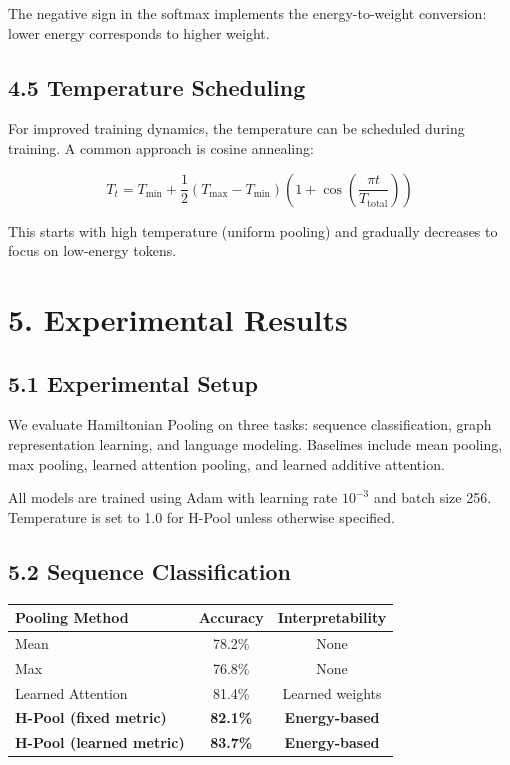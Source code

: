 \documentclass[12pt]{article}
\begin{document}
The negative sign in the softmax implements the energy-to-weight conversion: lower energy corresponds to higher weight.

\subsection{4.5 Temperature Scheduling}

For improved training dynamics, the temperature can be scheduled during training. A common approach is cosine annealing:

\begin{equation}
T_t = T_{\min} + \frac{1}{2}(T_{\max} - T_{\min}) \left(1 + \cos\left(\frac{\pi t}{T_{\text{total}}}\right)\right)
\end{equation}

This starts with high temperature (uniform pooling) and gradually decreases to focus on low-energy tokens.

\section{5. Experimental Results}

\subsection{5.1 Experimental Setup}

We evaluate Hamiltonian Pooling on three tasks: sequence classification, graph representation learning, and language modeling. Baselines include mean pooling, max pooling, learned attention pooling, and learned additive attention.

All models are trained using Adam with learning rate $10^{-3}$ and batch size 256. Temperature is set to 1.0 for H-Pool unless otherwise specified.

\subsection{5.2 Sequence Classification}

\begin{center}
\begin{tabular}{|l|c|c|}
\hline
\textbf{Pooling Method} & \textbf{Accuracy} & \textbf{Interpretability} \\
\hline
Mean & 78.2\% & None \\
Max & 76.8\% & None \\
Learned Attention & 81.4\% & Learned weights \\
\textbf{H-Pool (fixed metric)} & \textbf{82.1\%} & \textbf{Energy-based} \\
\textbf{H-Pool (learned metric)} & \textbf{83.7\%} & \textbf{Energy-based} \\
\hline
\end{tabular}
\end{center}
\end{document}
